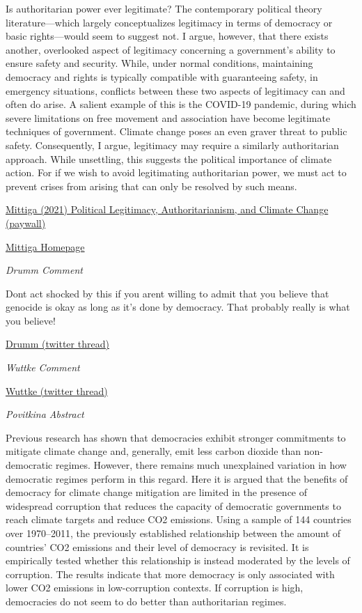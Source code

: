 \documentclass[
]{book}
\begin{document}
Is authoritarian power ever legitimate? The contemporary political theory literature---which largely conceptualizes legitimacy in terms of democracy or basic rights---would seem to suggest not. I argue, however, that there exists another, overlooked aspect of legitimacy concerning a government's ability to ensure safety and security. While, under normal conditions, maintaining democracy and rights is typically compatible with guaranteeing safety, in emergency situations, conflicts between these two aspects of legitimacy can and often do arise. A salient example of this is the COVID-19 pandemic, during which severe limitations on free movement and association have become legitimate techniques of government. Climate change poses an even graver threat to public safety. Consequently, I argue, legitimacy may require a similarly authoritarian approach. While unsettling, this suggests the political importance of climate action. For if we wish to avoid legitimating authoritarian power, we must act to prevent crises from arising that can only be resolved by such means.

\href{https://www.cambridge.org/core/journals/american-political-science-review/article/abs/political-legitimacy-authoritarianism-and-climate-change/E7391723A7E02FA6D536AC168377D2DE}{Mittiga (2021) Political Legitimacy, Authoritarianism, and Climate Change (paywall)}

\href{https://www.rossmittiga.com/publications.html}{Mittiga Homepage}

\emph{Drumm Comment}

Dont act shocked by this if you arent willing to admit that you believe that genocide is okay as long as it's done by democracy. That probably really is what you believe!

\href{https://twitter.com/drumm_colin/status/1477336568679469059}{Drumm (twitter thread)}

\emph{Wuttke Comment}

\href{https://twitter.com/Kunkakom/status/1476850341564063756}{Wuttke (twitter thread)}

\emph{Povitkina Abstract}

Previous research has shown that democracies exhibit stronger commitments to mitigate climate change and, generally, emit less carbon dioxide than non-democratic regimes. However, there remains much unexplained variation in how democratic regimes perform in this regard. Here it is argued that the benefits of democracy for climate change mitigation are limited in the presence of widespread corruption that reduces the capacity of democratic governments to reach climate targets and reduce CO2 emissions. Using a sample of 144 countries over 1970--2011, the previously established relationship between the amount of countries' CO2 emissions and their level of democracy is revisited. It is empirically tested whether this relationship is instead moderated by the levels of corruption. The results indicate that more democracy is only associated with lower CO2 emissions in low-corruption contexts. If corruption is high, democracies do not seem to do better than authoritarian regimes.
\end{document}
